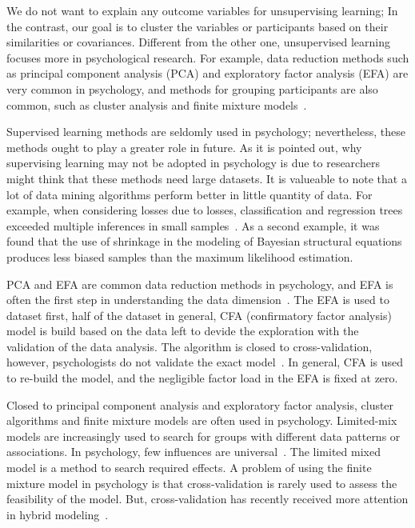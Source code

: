 We do not want to explain any outcome variables for unsupervising 
learning; In the contrast, 
our goal is to cluster the variables or participants
 based on their similarities or covariances. 
Different from the 
other one, unsupervised learning focuses more in 
psychological research. For example, data reduction methods such as
 principal component analysis (PCA) and exploratory factor analysis
 (EFA) are very common in psychology, 
and methods for grouping 
participants are also common, such as cluster analysis and finite 
mixture models~\cite{hid515-11}.

Supervised learning methods are seldomly used in psychology; 
nevertheless,
 these methods ought to play a greater role in future. As it is  
pointed out, why supervising learning may not be adopted in 
psychology is due to researchers might
 think that these methods need large datasets. It is valueable to
 note that a lot of data mining algorithms perform better in little 
quantity of data. For example, when considering losses due to losses, 
classification and regression trees exceeded multiple inferences in
 small samples~\cite{hid515-11}. 
As a second example, it was found that the use of 
shrinkage in the modeling of Bayesian 
structural equations produces less biased samples than the maximum
 likelihood estimation.

PCA and EFA are common data reduction methods in psychology, 
and EFA is often the first step in understanding the data
 dimension~\cite{hid515-11}. 
The EFA is used to dataset first, half of the dataset in general, 
CFA (confirmatory factor analysis) model
 is build based on the data left to devide 
the exploration with the validation of the data analysis. The 
algorithm is closed to cross-validation, however, psychologists 
do not validate the exact model~\cite{hid515-11}. 
In general, CFA is used to re-build the model, 
and the negligible factor load 
in the EFA is fixed at zero.

Closed to principal component analysis and exploratory factor 
analysis, cluster algorithms and finite mixture models
 are often used in psychology. 
Limited-mix models 
are increasingly used to search for groups with different data 
patterns or associations. In psychology, few influences are 
universal~\cite{hid515-11}. 
The limited mixed model is a method to 
search required effects. A problem of using the finite 
mixture model in psychology is that cross-validation is rarely used
 to assess the feasibility of the model. But, cross-validation
 has recently received more attention in hybrid 
modeling~\cite{hid515-11}.

